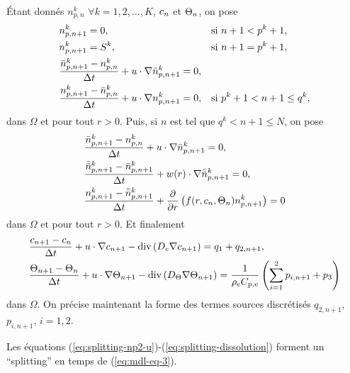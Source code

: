 Étant donnés $n_{p,n}^k$ $\forall k=1, 2, \dots, K$,
$c_n$ et $\Theta_n$, on pose
\begin{align}
  & n_{p,n+1}^k = 0, &&\text{si }  n + 1 < p^k + 1,\label{eq:splitting-np1-init}\\
  & n_{p,n+1}^k = S^k, &&\text{si } n + 1 = p^k + 1,\\
  & \frac{\bar n_{p,n+1}^k - n_{p,n}^k}{\Delta t} + u\cdot\nabla \bar n_{p,n+1}^k = 0,\\
  & \frac{n_{p,n+1}^k - \bar n_{p,n}^k}{\Delta t} + u\cdot\nabla n_{p,n+1}^k = 0, && \text{si } p^k + 1 < n+1 \leq q^k,\label{eq:splitting-np1-u}
\end{align}
dans $\Omega$ et pour tout $r > 0$. Puis, si $n$ est tel que $q^k < n
+ 1 \leq N$, on pose
\begin{align}
  &\displaystyle\frac{\bar n_{p,n+1}^k - n_{p,n}^k}{\Delta t} +
  u\cdot\nabla \bar n_{p,n+1}^k = 0,\label{eq:splitting-np2-u}\\
  &\displaystyle\frac{\bar{\bar n}_{p,n+1}^k - \bar n_{p,n+1}^k}{\Delta t} +
  w(r)\cdot\nabla \bar{\bar n}_{p,n+1}^k = 0,\label{eq:splitting-np2-w}\\
    &\displaystyle\frac{n_{p,n+1}^k - \bar{\bar n}_{p,n+1}^k}{\Delta t} +
    \displaystyle\frac{\partial}{\partial r}\left( f(r,
      c_n, \Theta_n)n_{p,n+1}^k \right) =
    0\label{eq:splitting-dissolution}
\end{align}
dans $\Omega$ et pour tout $r > 0$. Et finalement
\begin{align}
&\frac{c_{n+1} - c_{n}}{\Delta t} + u\cdot\nabla
c_{n+1} - \mathrm{div}\left( D_c \nabla c_{n+1} \right) = q_1
+ q_{2,n+1},\label{eq:splitting-c} \\
&\frac{\Theta_{n+1} - \Theta_{n}}{\Delta t} + u\cdot\nabla
\Theta_{n+1} - \mathrm{div}\left( D_\Theta \nabla \Theta_{n+1} \right) =
\frac{1}{\rho_\mathrm{e} C_{\mathrm{p,e}}}\left( \sum_{i =
    1}^2p_{i,n+1} + p_3 \right)\label{eq:splitting-t}
\end{align}
dans $\Omega$. On précise maintenant la forme des termes sources
discrétisés $q_{2,n+1}$, $p_{i,n+1}$, $i = 1,2$.

\begin{remarque}
Les équations (\ref{eq:splitting-np2-u})-(\ref{eq:splitting-dissolution}) forment un ``splitting'' en
temps de (\ref{eq:mdl-eq-3}).
\end{remarque}

